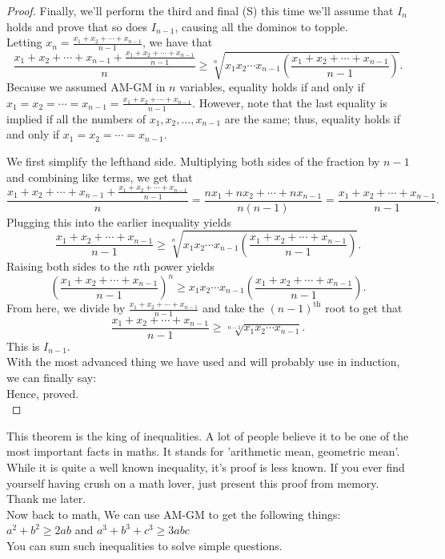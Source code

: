 \begin{proof}
Finally, we'll perform the third and final (S) this time we'll assume that $I_n$ holds and prove that so does $I_{n-1}$, causing all the dominos to topple.\\
Letting $x_n = \frac{x_1 + x_2 + \cdots + x_{n-1}}{n-1}$, we have that\[\frac{x_1 + x_2 + \cdots + x_{n-1} + \frac{x_1 + x_2 + \cdots + x_{n-1}}{n-1}}{n} \geq \sqrt[n]{x_1 x_2 \cdots x_{n-1} \left(\frac{x_1 + x_2 + \cdots + x_{n-1}}{n-1}\right)}.\]Because we assumed AM-GM in $n$ variables, equality holds if and only if $x_1 = x_2 = \cdots = x_{n-1} = \frac{x_1 + x_2 + \cdots + x_{n-1}}{n-1}$. However, note that the last equality is implied if all the numbers of $x_1, x_2, \ldots, x_{n-1}$ are the same; thus, equality holds if and only if $x_1 = x_2 = \cdots = x_{n-1}$.

We first simplify the lefthand side. Multiplying both sides of the fraction by $n-1$ and combining like terms, we get that\[\frac{x_1 + x_2 + \cdots + x_{n-1} + \frac{x_1 + x_2 + \cdots + x_{n-1}}{n-1}}{n} = \frac{nx_1 + nx_2 + \cdots + nx_{n-1}}{n(n-1)} = \frac{x_1 + x_2 + \cdots + x_{n-1}}{n-1}.\]Plugging this into the earlier inequality yields\[\frac{x_1 + x_2 + \cdots + x_{n-1}}{n-1} \geq \sqrt[n]{x_1 x_2 \cdots x_{n-1} \left(\frac{x_1 + x_2 + \cdots + x_{n-1}}{n-1} \right)}.\]Raising both sides to the $n$th power yields\[\left( \frac{x_1 + x_2 + \cdots + x_{n-1}}{n-1}\right)^n \geq x_1 x_2 \cdots x_{n-1}\left(\frac{x_1 + x_2 + \cdots + x_{n-1}}{n-1}\right).\]From here, we divide by $\frac{x_1 + x_2 + \cdots + x_{n-1}}{n-1}$ and take the $(n-1)^{\textrm{th}}$ root to get that\[\frac{x_1 + x_2 + \cdots + x_{n-1}}{n-1} \geq \sqrt[n-1]{x_1 x_2 \cdots x_{n-1}}.\]This is $I_{n-1}$. \\
With the most advanced thing we have used and will probably use in induction, we can finally say:\\
Hence, proved.\\
\end{proof}
This theorem is the king of inequalities. A lot of people believe it to be one of the most important facts in maths. It stands for 'arithmetic mean, geometric mean'. While it is quite a well known inequality, it's proof is less known. If you ever find yourself having crush on a math lover, just present this proof from memory. Thank me later.\\
Now back to math, We can use AM-GM to get the following things:\\
$a^2+b^2 \geq 2ab$ and $a^3+b^3+c^3 \geq 3abc$\\
You can sum such inequalities to solve simple questions.\\
